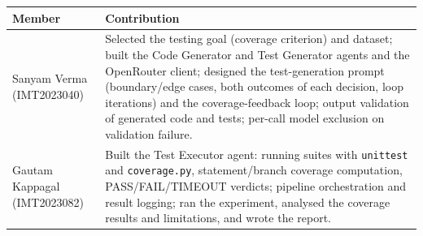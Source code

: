 \documentclass[11pt,a4paper]{article}
\begin{document}
\begin{table}[H]
\centering\small
\begin{tabularx}{\linewidth}{l X}
\toprule
Member & Contribution\\
\midrule
Sanyam Verma (IMT2023040) &
Selected the testing goal (coverage criterion) and dataset; built the Code Generator and
Test Generator agents and the OpenRouter client; designed the test-generation prompt
(boundary/edge cases, both outcomes of each decision, loop iterations) and the
coverage-feedback loop; output validation of generated code and tests; per-call model
exclusion on validation failure.\\
Gautam Kappagal (IMT2023082) &
Built the Test Executor agent: running suites with \texttt{unittest} and
\texttt{coverage.py}, statement/branch coverage computation, PASS/FAIL/TIMEOUT verdicts;
pipeline orchestration and result logging; ran the experiment, analysed the coverage
results and limitations, and wrote the report.\\
\bottomrule
\end{tabularx}
\end{table}
\end{document}
